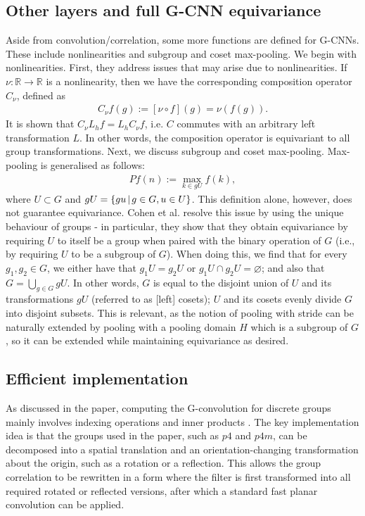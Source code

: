 \documentclass{article}
\begin{document}
\subsection{Other layers and full G-CNN equivariance}
    Aside from convolution/correlation, some more functions are defined for G-CNNs. These include nonlinearities and subgroup and coset max-pooling. We begin with nonlinearities. First, they address issues that may arise due to nonlinearities. If \(\nu: \mathbb{R} \to \mathbb{R}\) is a nonlinearity, then we have the corresponding composition operator \(C_\nu\), defined as
    \begin{align*}
        C_\nu f(g) := [\nu \circ f](g) = \nu(f(g)).
    \end{align*}
    It is shown that \(C_\nu L_h f = L_h C_\nu f\), i.e. \(C\) commutes with an arbitrary left transformation \(L\). In other words, the composition operator is equivariant to all group transformations. Next, we discuss subgroup and coset max-pooling. Max-pooling is generalised as follows:
    \begin{align*}
        Pf(n) := \max_{k \in gU} f(k),
    \end{align*}
    where \(U \subset G\) and \(gU = \{gu \hspace{0.5 mm}|\hspace{0.5 mm} g \in G, u \in U\}\). This definition alone, however, does not guarantee equivariance. Cohen et al. resolve this issue by using the unique behaviour of groups - in particular, they show that they obtain equivariance by requiring \(U\) to itself be a group when paired with the binary operation of \(G\) (i.e., by requiring \(U\) to be a subgroup of \(G\)). When doing this, we find that for every \(g_1, g_2 \in G\), we either have that \(g_1U = g_2U\) or \(g_1U \cap g_2U = \varnothing\); and also that \(G = \bigcup_{g \in G} gU\). In other words, \(G\) is equal to the disjoint union of \(U\) and its transformations \(gU\) (referred to as [left] cosets); \(U\) and its cosets evenly divide \(G\) into disjoint subsets. This is relevant, as the notion of pooling with stride can be naturally extended by pooling with a pooling domain \(H\) which is a subgroup of \(G\), so it can be extended while maintaining equivariance as desired.

\subsection{Efficient implementation}

As discussed in the paper, computing the G-convolution for discrete groups mainly involves indexing operations and inner products \cite{cohen2016}. The key implementation idea is that the groups used in the paper, such as \(p4\) and \(p4m\), can be decomposed into a spatial translation and an orientation-changing transformation about the origin, such as a rotation or a reflection. This allows the group correlation to be rewritten in a form where the filter is first transformed into all required rotated or reflected versions, after which a standard fast planar convolution can be applied.
\end{document}
